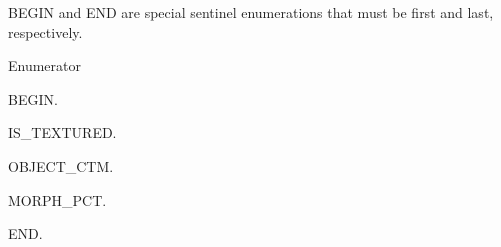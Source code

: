 B\-E\-G\-I\-N and E\-N\-D are special sentinel enumerations that must be first and last, respectively. \begin{Desc}
\item[Enumerator]\par
\begin{description}
\item[{\em 
\hypertarget{class_object_a8c11d8700b0bb79a46c61f2de4f23fa3a8a65225741e4db1df295c9cab71a98c0}{B\-E\-G\-I\-N}\label{class_object_a8c11d8700b0bb79a46c61f2de4f23fa3a8a65225741e4db1df295c9cab71a98c0}
}]B\-E\-G\-I\-N. \item[{\em 
\hypertarget{class_object_a8c11d8700b0bb79a46c61f2de4f23fa3a8fecaee23530c9befe7feb5166e81484}{I\-S\-\_\-\-T\-E\-X\-T\-U\-R\-E\-D}\label{class_object_a8c11d8700b0bb79a46c61f2de4f23fa3a8fecaee23530c9befe7feb5166e81484}
}]I\-S\-\_\-\-T\-E\-X\-T\-U\-R\-E\-D. \item[{\em 
\hypertarget{class_object_a8c11d8700b0bb79a46c61f2de4f23fa3a9aaf45d5144b52065016b5b39e909851}{O\-B\-J\-E\-C\-T\-\_\-\-C\-T\-M}\label{class_object_a8c11d8700b0bb79a46c61f2de4f23fa3a9aaf45d5144b52065016b5b39e909851}
}]O\-B\-J\-E\-C\-T\-\_\-\-C\-T\-M. \item[{\em 
\hypertarget{class_object_a8c11d8700b0bb79a46c61f2de4f23fa3ac93e286d52dad730ccf3fdab9b102902}{M\-O\-R\-P\-H\-\_\-\-P\-C\-T}\label{class_object_a8c11d8700b0bb79a46c61f2de4f23fa3ac93e286d52dad730ccf3fdab9b102902}
}]M\-O\-R\-P\-H\-\_\-\-P\-C\-T. \item[{\em 
\hypertarget{class_object_a8c11d8700b0bb79a46c61f2de4f23fa3ad78facbf844c1259f464a49061e1d7ed}{E\-N\-D}\label{class_object_a8c11d8700b0bb79a46c61f2de4f23fa3ad78facbf844c1259f464a49061e1d7ed}
}]E\-N\-D. \end{description}
\end{Desc}


